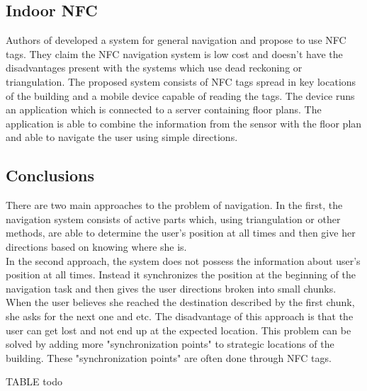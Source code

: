 \subsection{Indoor NFC}
Authors of \cite{indoorNFC} developed a system for general navigation and propose to use NFC tags. They claim the NFC navigation system is low cost and doesn't have the disadvantages present with the systems which use dead reckoning or triangulation. The proposed system consists of NFC tags spread in key locations of the building and a mobile device capable of reading the tags. The device runs an application which is connected to a server containing floor plans. The application is able to combine the information from the sensor with the floor plan and able to navigate the user using simple directions.

\subsection{Conclusions}
There are two main approaches to the problem of navigation. In the first, the navigation system consists of active parts which, using triangulation or other methods, are able to determine the user's position at all times and then give her directions based on knowing where she is.\\In the second approach, the system does not possess the information about user's position at all times. Instead it synchronizes the position at the beginning of the navigation task and then gives the user directions broken into small chunks. When the user believes she reached the destination described by the first chunk, she asks for the next one and etc. The disadvantage of this approach is that the user can get lost and not end up at the expected location. This problem can be solved by adding more "synchronization points" to strategic locations of the building. These "synchronization points" are often done through NFC tags.

TABLE todo
